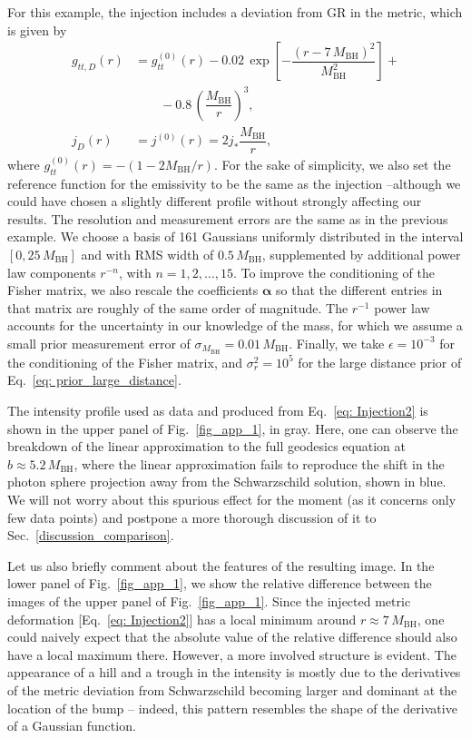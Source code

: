 \documentclass[%
nofootinbib,
 amsmath,amssymb,
 aps,
floatfix,
twocolumn
]{revtex4-2}
\begin{document}
For this example, the injection includes a deviation from GR in the metric, which is given by
%
\begin{align} \label{eq: Injection2}
    g_{tt,D}(r) &= g^{(0)}_{tt} (r) 
     - 0.02 \, \exp\left[-\dfrac{(r - 7\,M_\text{BH} )^2 }{ M_\text{BH}^2}\right] + \nonumber\\
     & \qquad - 0.8 \, \left(\dfrac{M_\text{BH}}{r}\right)^{3}   , \nonumber\\
    j_{D}(r) &= j^{(0)}(r) =  2 j_{*}  \dfrac{ M_\text{BH}}{r},
\end{align}
%
where
%
\(g^{(0)}_{tt}(r) = - ( 1 - 2 M_\text{BH} / r ) \). 
For the sake of simplicity, we also set the reference function for the emissivity to be the same as the injection --although we could have chosen a slightly different profile without strongly affecting our results. 
The resolution and measurement errors are the same as in the previous example. 
We choose a basis  of 161 Gaussians uniformly distributed in the interval \([0, 25 \, M_\text{BH}]\) and with RMS width of \(0.5 \, M_\text{BH}\), supplemented by additional power law components \(r^{-n}\), with \(n = 1, 2, \dots, 15\). To improve the conditioning of the Fisher matrix, we also 
rescale the coefficients \(\boldsymbol{\alpha}\) so that the different entries in that matrix are roughly of the same order of magnitude. 
The  \(r^{-1}\) power law accounts for the uncertainty in our knowledge of the mass, for which we assume a small prior measurement error of \(\sigma_{M_\text{BH}} = 0.01\,M_\text{BH}\). 
Finally, we take \(\epsilon = 10^{-3}\) for the conditioning of the Fisher matrix, and \(\sigma^2_{r} = 10^5\)  for the large distance prior of Eq.~\eqref{eq: prior_large_distance}.

The intensity profile  used as data and produced from Eq.~\eqref{eq: Injection2} is shown in the upper panel of Fig.~\ref{fig_app_1}, in gray. 
Here, one can observe the breakdown of the linear approximation
to the full geodesics equation 
at \(b\approx 5.2 \, M_\text{BH}\), where the linear approximation fails to reproduce the shift in the photon sphere projection away from the Schwarzschild solution, shown in blue. We will not worry about this spurious effect for the moment (as it concerns only few data points) and postpone a more thorough  discussion of it to Sec.~\ref{discussion_comparison}. 

Let us also briefly comment about the features of the resulting image. In the lower panel of Fig.~\ref{fig_app_1}, we show the relative difference between the images of the upper panel of Fig.~\ref{fig_app_1}. Since the injected metric deformation [Eq.~\eqref{eq: Injection2}] has a local minimum around \(r\approx 7\,M_\mathrm{BH}\), one could naively expect that the absolute value of the relative difference should also have a local maximum there. However, a more involved structure is evident. The appearance of a hill and a trough in the intensity is mostly due to the derivatives of the metric deviation from Schwarzschild becoming larger and dominant at the location of the bump -- indeed, this pattern resembles the shape of the derivative of a Gaussian function.
\end{document}
